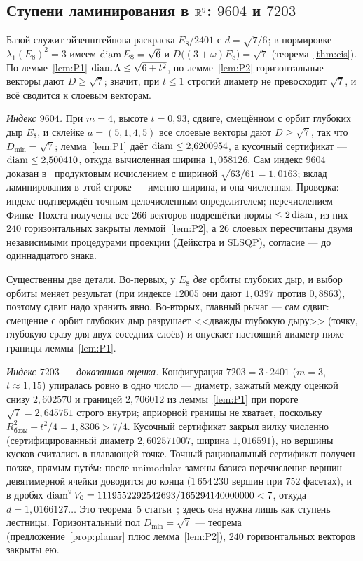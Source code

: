 \subsection{Ступени ламинирования в $\mathbb{R}^9$: $9604$ и $7203$}\label{ssec:cand9}

Базой служит эйзенштейнова раскраска $E_8/2401$ с $d=\sqrt{7/6}$; в
нормировке $\lambda_1(E_8)^2=3$ имеем $\operatorname{diam} E_8=\sqrt6$ и
$D\bigl((3+\omega)E_8\bigr)=\sqrt7$ (теорема~\ref{thm:eis}). По
лемме~\ref{lem:P1} $\operatorname{diam}\Lambda\le\sqrt{6+t^2}$, по лемме~\ref{lem:P2}
горизонтальные векторы дают $D\ge\sqrt7$; значит, при $t\le1$ строгий диаметр
не превосходит $\sqrt7$, и всё сводится к слоевым векторам.

\emph{Индекс $9604$.} При $m=4$, высоте $t=0{,}93$, сдвиге, смещённом с орбит
глубоких дыр $E_8$, и склейке $a=(5,1,4,5)$ все слоевые векторы дают
$D\ge\sqrt7$, так что $D_{\min}=\sqrt7$; лемма~\ref{lem:P1} даёт
$\operatorname{diam}\le2{,}6200954$, а кусочный сертификат --- $\operatorname{diam}\le2{,}500410$, откуда
вычисленная ширина $1{,}058126$. Сам индекс $9604$ доказан в~\cite{Bounds}
продуктовым исчислением с шириной $\sqrt{63/61}=1{,}0163$; вклад
ламинирования в этой строке --- именно ширина, и она численная. Проверка:
индекс подтверждён точным целочисленным определителем; перечислением
Финке--Похста получены все $266$ векторов подрешётки нормы $\le2\operatorname{diam}$, из них
$240$ горизонтальных закрыты леммой~\ref{lem:P2}, а $26$ слоевых пересчитаны
двумя независимыми процедурами проекции (Дейкстра и SLSQP), согласие ---
до одиннадцатого знака.

Существенны две детали. Во-первых, у $E_8$ \emph{две} орбиты глубоких дыр, и
выбор орбиты меняет результат (при индексе $12005$ они дают $1{,}0397$ против
$0{,}8863$), поэтому сдвиг надо хранить явно. Во-вторых, главный рычаг --- сам
сдвиг: смещение с орбит глубоких дыр разрушает <<дважды глубокую дыру>> (точку,
глубокую сразу для двух соседних слоёв) и опускает настоящий диаметр ниже
границы леммы~\ref{lem:P1}.

\emph{Индекс $7203$ --- доказанная оценка.} Конфигурация $7203=3\cdot2401$
($m=3$, $t\approx1{,}15$) упиралась ровно в одно число --- диаметр, зажатый
между оценкой снизу $2{,}602570$ и границей $2{,}706012$ из леммы~\ref{lem:P1}
при пороге $\sqrt7=2{,}645751$ строго внутри; априорной границы не хватает,
поскольку $R_{\text{базы}}^2+t^2/4=1{,}8306>7/4$. Кусочный сертификат закрыл
вилку численно (сертифицированный диаметр $2{,}602571007$, ширина
$1{,}016591$), но вершины кусков считались в плавающей точке. Точный
рациональный сертификат получен позже, прямым путём: после unimodular-замены
базиса перечисление вершин девятимерной ячейки доводится до конца
($1\,654\,230$ вершин при $752$ фасетах), и в дробях
$\operatorname{diam}^2V_0=1119552292542693/165294140000000<7$, откуда
$d=1{,}0166127\ldots$ Это теорема~5 статьи~\cite{Bounds}; здесь она нужна лишь
как ступень лестницы. Горизонтальный пол $D_{\min}=\sqrt7$ --- теорема
(предложение~\ref{prop:planar} плюс лемма~\ref{lem:P2}), $240$ горизонтальных
векторов закрыты ею.

